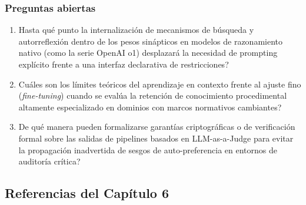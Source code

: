 \subsubsection*{Preguntas abiertas}
\begin{enumerate}[label=\arabic*., leftmargin=2em, itemsep=0.15cm]
    \item \textquestiondown Hasta qué punto la internalización de mecanismos de búsqueda y autorreflexión dentro de los pesos sinápticos en modelos de razonamiento nativo (como la serie OpenAI o1) desplazará la necesidad de prompting explícito frente a una interfaz declarativa de restricciones?
    \item \textquestiondown Cuáles son los límites teóricos del aprendizaje en contexto frente al ajuste fino (\textit{fine-tuning}) cuando se evalúa la retención de conocimiento procedimental altamente especializado en dominios con marcos normativos cambiantes?
    \item \textquestiondown De qué manera pueden formalizarse garantías criptográficas o de verificación formal sobre las salidas de pipelines basados en LLM-as-a-Judge para evitar la propagación inadvertida de sesgos de auto-preferencia en entornos de auditoría crítica?
\end{enumerate}

\newpage
{}
\subsection*{Referencias del Capítulo 6}

